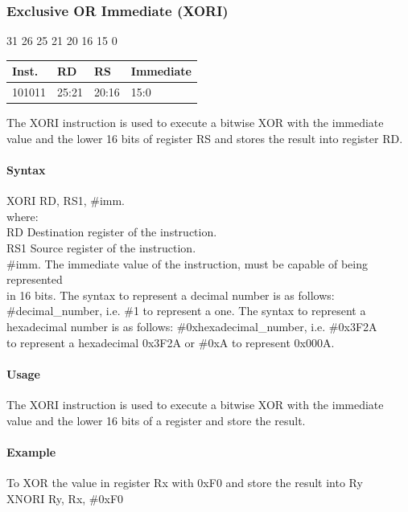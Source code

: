 \documentclass[12pt]{article}
\newcommand{\iTypeInstruction}[6]
{%
    \hspace{1.6cm}31 \hspace{1.15cm}26 \hspace{.05cm}25 \hspace{.8cm}21 \hspace{.05cm}20 \hspace{.8cm}16 \hspace{.05cm}15 \hspace{6.4cm}0
    \vspace{-.25cm}
    \begin{center}
        \begin{tabular}{ |p{1.8cm}|p{1.5cm}|p{1.5cm}|p{6.8cm}| }
            \hline
            \textbf{Inst.} & \textbf{RD} &  \textbf{RS} & \textbf{Immediate}\\
            \hline
            #1 & 25:21 & 20:16 &15:0\\
            \hline
        \end{tabular}
    \end{center}
    
    \noindent
    #2
    
    \paragraph{Syntax}
    \begin{flushleft}
    #3 RD, RS1, \#imm.\\
    \vspace{1em}        %
    where:\\
    \vspace{1em}
    RD  \hspace{3.6em} Destination register of the instruction.\\
    \vspace{1em}
    RS1  \hspace{3.35em} Source register of the instruction.\\
    \vspace{1em}
    \#imm.  \hspace{1.8em} The immediate value of the instruction, must be capable of being represented\\             \hspace{5.4em} in 16 bits. The syntax to represent a decimal number is as follows:\\
            \hspace{5.4em} \#decimal\_number, i.e. \#1 to represent a one. The syntax to represent a\\
            \hspace{5.4em} hexadecimal number is as follows: \#0xhexadecimal\_number, i.e. \#0x3F2A \\
            \hspace{5.4em} to represent a hexadecimal 0x3F2A or \#0xA to represent 0x000A.\\
    \end{flushleft}
    
    \paragraph{Usage}
    \begin{flushleft}
    #4\\
    \end{flushleft}
    \paragraph{Example}
    \begin{flushleft}
    #5\\
    \vspace{1em}
    #6
    \end{flushleft}}
\begin{document}

    \newpage
    \subsubsection{Exclusive OR Immediate (XORI)}
    
    \iTypeInstruction
    {101011}
    {The XORI instruction is used to execute a bitwise XOR with the immediate value and the lower 16 bits of register RS and stores the result into register RD.}
    {XORI}
    {The XORI instruction is used to execute a bitwise XOR with the immediate value and the lower 16 bits of a register and store the result.}
    {To XOR the value in register Rx with 0xF0 and store the result into Ry}
    {XNORI Ry, Rx, \#0xF0}
    
    
    
\end{document}
